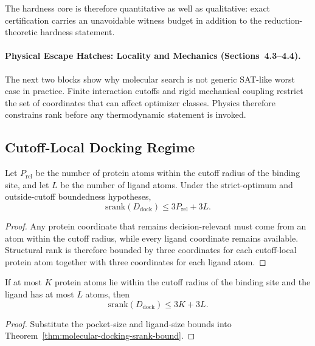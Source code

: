 The hardness core is therefore quantitative as well as qualitative: exact certification carries an unavoidable witness budget in addition to the reduction-theoretic hardness statement.

\paragraph{Physical Escape Hatches: Locality and Mechanics (Sections~4.3--4.4).}
The next two blocks show why molecular search is not generic SAT-like worst case in practice. Finite interaction cutoffs and rigid mechanical coupling restrict the set of coordinates that can affect optimizer classes. Physics therefore constrains rank before any thermodynamic statement is invoked.

\subsection{Cutoff-Local Docking Regime}

\begin{theorem}\label{thm:molecular-docking-srank-bound}
Let $P_{\mathrm{rel}}$ be the number of protein atoms within the cutoff radius of the binding site, and let $L$ be the number of ligand atoms. Under the strict-optimum and outside-cutoff boundedness hypotheses,
\[
\mathrm{srank}(D_{\mathrm{dock}}) \le 3P_{\mathrm{rel}} + 3L.
\]
\end{theorem}

\begin{proof}
Any protein coordinate that remains decision-relevant must come from an atom within the cutoff radius, while every ligand coordinate remains available. Structural rank is therefore bounded by three coordinates for each cutoff-local protein atom together with three coordinates for each ligand atom.
\end{proof}

\begin{corollary}\label{cor:bounded-pocket-regime}
If at most $K$ protein atoms lie within the cutoff radius of the binding site and the ligand has at most $L$ atoms, then
\[
\mathrm{srank}(D_{\mathrm{dock}}) \le 3K + 3L.
\]
\end{corollary}

\begin{proof}
Substitute the pocket-size and ligand-size bounds into Theorem~\ref{thm:molecular-docking-srank-bound}.
\end{proof}

